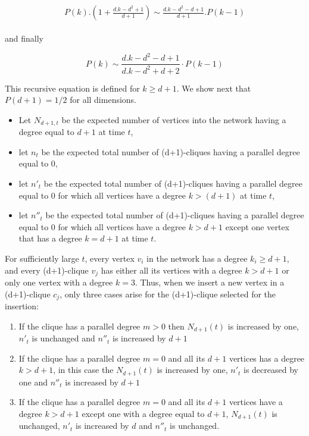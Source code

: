 \documentclass[11pt]{iopart}
\newenvironment{proof}[1][Proof]{\begin{trivlist}
    \item[\hskip \labelsep {\bfseries #1}]}{\end{trivlist}}
\begin{document}
\begin{proof}
\begin{eqnarray}
\label{eqdd3}
 \begin{array}{ll}
   P(k).\left(1+ \frac{d.k-d^2+1}{d+1}\right) \sim \frac{d.k-d^2-d+1}{d+1}.P(k-1)
 \end{array}
\end{eqnarray} 


and finally 

\begin{equation}
\label{Eq.dd6}
 P(k) \sim \frac{d.k-d^2-d+1}{d.k-d^2+d+2} \cdot P(k-1)
\end{equation}

This recursive equation is defined for $k\ge d+1$. We show next that $P(d+1)=1/2$ for all dimensions.
 
\begin{itemize}
 \item Let $N_{d+1,t}$ be the expected number of vertices into the network having a degree equal to $d+1$ at time $t$, 
 \item let $n_t$ be the expected total number of (d+1)-cliques having a parallel degree equal to $0$, 
 \item let $n'_t$ be the expected total number of (d+1)-cliques having a parallel degree equal to $0$ for which all vertices have a degree $k>(d+1)$ at time $t$,
 \item let $n''_t$ be the expected total number of (d+1)-cliques having a parallel degree equal to $0$ for which all vertices have a degree $k>d+1$ except one vertex that has a degree $k=d+1$ at time $t$.
\end{itemize}

For sufficiently large $t$, every vertex $v_i$ in the network has a degree $k_i \ge d+1$, and every (d+1)-clique $v_j$ has either all its vertices with a degree $k>d+1$ or only one vertex with a degree $k=3$. Thus, when we insert a new vertex in a (d+1)-clique $c_j$, only three cases arise for the (d+1)-clique selected for the insertion:
\begin{enumerate}
 \item If the clique has a parallel degree $m>0$ then $N_{d+1}(t)$ is increased by one, $n'_t$ is unchanged and $n''_t$ is increased by $d+1$
 \item If the clique has a parallel degree $m=0$ and all its $d+1$ vertices has a degree $k>d+1$, in this case the $N_{d+1}(t)$ is increased by one, $n'_t$ is decreased by one and $n''_t$ is increased by $d+1$ 
  \item If the clique has a parallel degree $m=0$ and all its $d+1$ vertices have a degree $k>d+1$ except one with a degree equal to $d+1$, $N_{d+1}(t)$ is unchanged, $n'_t$ is increased by $d$ and $n''_t$ is unchanged. 
\end{enumerate}


\end{proof}
\end{document}
